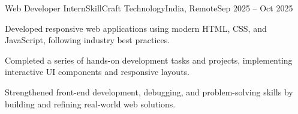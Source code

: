 \begin{cventry}{Web Developer Intern}{SkillCraft Technology}{India, Remote}{Sep 2025 -- Oct 2025}
    \item Developed responsive web applications using modern HTML, CSS, and JavaScript, following industry best practices.
    \item Completed a series of hands-on development tasks and projects, implementing interactive UI components and responsive layouts.
    \item Strengthened front-end development, debugging, and problem-solving skills by building and refining real-world web solutions.
\end{cventry}